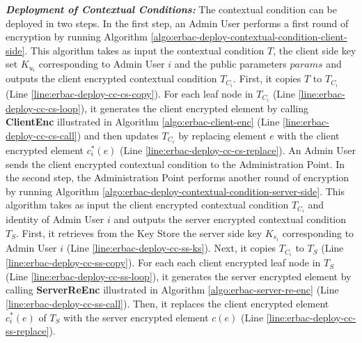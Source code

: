 \documentclass[epsfig,a4paper,11pt,titlepage]{book}
\numberwithin{algorithm}{chapter}
\begin{document}
\noindent \emph{\textbf{Deployment of Contextual Conditions:}}
The contextual condition can be deployed in two steps. In the first step, an Admin User performs a first round of encryption by running Algorithm \ref{algo:erbac-deploy-contextual-condition-client-side}. This algorithm takes as input the contextual condition $T$, the client side key set $K_{u_i}$ corresponding to Admin User $i$ and the public parameters $params$ and outputs the client encrypted contextual condition $T_{C_i}$. First, it copies $T$ to $T_{C_i}$ (Line \ref{line:erbac-deploy-cc-cs-copy}). For each leaf node in $T_{C_i}$ (Line \ref{line:erbac-deploy-cc-cs-loop}), it generates the client encrypted element by calling \textbf{ClientEnc} illustrated in Algorithm \ref{algo:erbac-client-enc} (Line \ref{line:erbac-deploy-cc-cs-call}) and then updates $T_{C_i}$ by replacing element $e$ with the client encrypted element $c^*_i (e)$ (Line \ref{line:erbac-deploy-cc-cs-replace}). An Admin User sends the client encrypted contextual condition to the Administration Point.
In the second step, the Administration Point performs another round of encryption by running Algorithm \ref{algo:erbac-deploy-contextual-condition-server-side}. This algorithm takes as input the client encrypted contextual condition $T_{C_i}$ and identity of Admin User $i$ and outputs the server encrypted contextual condition $T_{S}$. First, it retrieves from the Key Store the server side key $K_{s_i}$ corresponding to Admin User $i$ (Line \ref{line:erbac-deploy-cc-ss-ks}). Next, it copies $T_{C_i}$ to $T_{S}$ (Line \ref{line:erbac-deploy-cc-ss-copy}). For each each client encrypted leaf node in $T_{S}$ (Line \ref{line:erbac-deploy-cc-ss-loop}), it generates the server encrypted element by calling \textbf{ServerReEnc} illustrated in Algorithm \ref{algo:erbac-server-re-enc} (Line \ref{line:erbac-deploy-cc-ss-call}). Then, it replaces the client encrypted element $c^*_i (e)$ of $T_{S}$ with the server encrypted element $c(e)$ (Line \ref{line:erbac-deploy-cc-ss-replace}).
\end{document}
